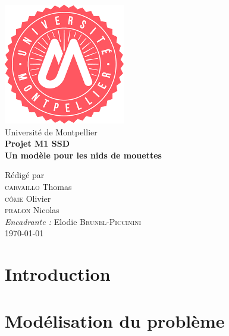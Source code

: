 \documentclass[frenchb]{report}
\newcommand{\1}{\mathbbm{1}}
\theoremstyle{definition}\newtheorem{defn}{Définition}
\theoremstyle{definition}\newtheorem{exm}{Exemple}
\theoremstyle{definition}\newtheorem{nota}{Notation}
\theoremstyle{definition}\newtheorem{rem}{Remarque}
\begin{document}
\begin{titlepage}
\begin{center}
\includegraphics[scale=0.5]{logo.png}\\[1cm]
{\LARGE Université de Montpellier}\\[1.5cm]
\linespread{1.2}\huge {\bfseries Projet M1 SSD }\\[0.5cm]
\linespread{1.2}\LARGE {\bfseries Un modèle pour les nids de mouettes}\\[1.5cm]
\linespread{1}

{\large Rédigé par\\}
{\Large \textsc{carvaillo} Thomas}\\
{\Large \textsc{côme} Olivier}\\
{\Large \textsc{pralon} Nicolas}\\[1cm]
{\large \emph{Encadrante :} Elodie \textsc{Brunel-Piccinini}}\\[1cm] %
\today
\end{center}
\end{titlepage}
\tableofcontents
\newpage

\chapter*{Introduction}


\pagebreak


\chapter{Modélisation du problème}
\end{document}
